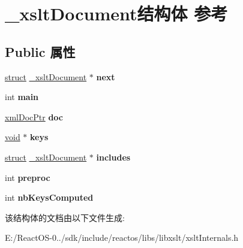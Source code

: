 \hypertarget{struct__xslt_document}{}\section{\+\_\+xslt\+Document结构体 参考}
\label{struct__xslt_document}
\subsection*{Public 属性}
\begin{DoxyCompactItemize}
\item 
\mbox{\label{struct__xslt_document_afe5be53da466076448911c550d486172}} 
\hyperlink{interfacestruct}{struct} \hyperlink{struct__xslt_document}{\+\_\+xslt\+Document} $\ast$ {\bfseries next}
\item 
\mbox{\label{struct__xslt_document_aebc98e6b1434820174cc776e8de0f54d}} 
int {\bfseries main}
\item 
\mbox{\label{struct__xslt_document_ac037ca9a9bbfd363d339570d8b5f4d71}} 
\hyperlink{struct__xml_doc}{xml\+Doc\+Ptr} {\bfseries doc}
\item 
\mbox{\label{struct__xslt_document_a898b87579dd1a0af9fe210d5d47480e7}} 
\hyperlink{interfacevoid}{void} $\ast$ {\bfseries keys}
\item 
\mbox{\label{struct__xslt_document_ac0e1b1bbe62e6e3f02fc0a399954b8ba}} 
\hyperlink{interfacestruct}{struct} \hyperlink{struct__xslt_document}{\+\_\+xslt\+Document} $\ast$ {\bfseries includes}
\item 
\mbox{\label{struct__xslt_document_a3e512880d3005a43331fc43173e36101}} 
int {\bfseries preproc}
\item 
\mbox{\label{struct__xslt_document_a80bfa12e0b4dcc8fdb777663726db0c1}} 
int {\bfseries nb\+Keys\+Computed}
\end{DoxyCompactItemize}


该结构体的文档由以下文件生成\+:\begin{DoxyCompactItemize}
\item 
E\+:/\+React\+O\+S-\/0../sdk/include/reactos/libs/libxslt/xslt\+Internals.\+h\end{DoxyCompactItemize}
